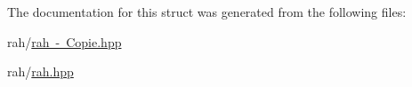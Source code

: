 The documentation for this struct was generated from the following files\+:\begin{DoxyCompactItemize}
\item 
rah/\mbox{\hyperlink{rah_01-_01_copie_8hpp}{rah -\/ Copie.\+hpp}}\item 
rah/\mbox{\hyperlink{rah_8hpp}{rah.\+hpp}}\end{DoxyCompactItemize}
